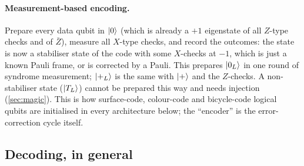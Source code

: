 \paragraph{Measurement-based encoding.} Prepare every data qubit in $\lvert 0 \rangle$ (which is already a $+1$ eigenstate of all $Z$-type checks and of $\bar Z$), measure all $X$-type checks, and record the outcomes: the state is now a stabiliser state of the code with some $X$-checks at $-1$, which is just a known Pauli frame, or is corrected by a Pauli. This prepares $\lvert 0_L \rangle$ in one round of syndrome measurement; $\lvert +_L \rangle$ is the same with $\lvert + \rangle$ and the $Z$-checks. A non-stabiliser state ($\lvert T_L \rangle$) cannot be prepared this way and needs injection (\cref{sec:magic}). This is how surface-code, colour-code and bicycle-code logical qubits are initialised in every architecture below; the ``encoder'' is the error-correction cycle itself.

\subsection{Decoding, in general}\label{sec:decoding-general}

